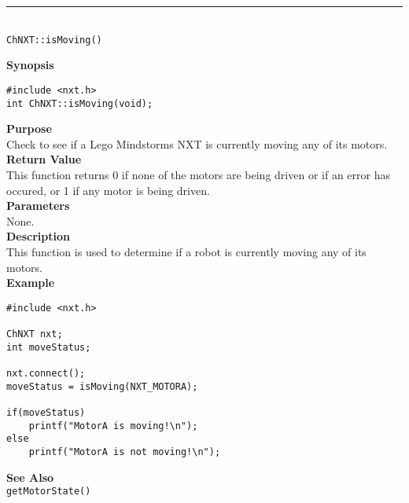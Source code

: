 \noindent
\vspace{5pt}
\rule{4.5in}{0.015in}\\
\noindent
{\LARGE \texttt{ChNXT::isMoving()} }\\


\noindent
{\bf Synopsis}
\begin{lstlisting}
#include <nxt.h>
int ChNXT::isMoving(void);
\end{lstlisting}

\noindent
{\bf Purpose}\\
Check to see if a Lego Mindstorms NXT is currently moving any of its motors.\\

\noindent
{\bf Return Value}\\
This function returns 0 if none of the motors are being driven or 
if an error has occured, or 1 if any motor is being driven.\\

\noindent
{\bf Parameters}\\
None.\\

\noindent
{\bf Description}\\
This function is used to determine if a robot is currently moving any of its motors.\\

\noindent
{\bf Example}
\begin{lstlisting}
#include <nxt.h>

ChNXT nxt;
int moveStatus;

nxt.connect();
moveStatus = isMoving(NXT_MOTORA);

if(moveStatus)
    printf("MotorA is moving!\n");
else
    printf("MotorA is not moving!\n");
\end{lstlisting}

\noindent
{\bf See Also}\\
\texttt{getMotorState()}\\
